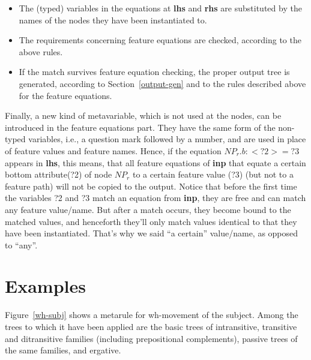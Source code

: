\begin{itemize}
\item   The (typed) variables in the equations at {\bf lhs} and {\bf rhs} are 
        substituted by the names of the nodes they have been instantiated to.

\item   The requirements concerning feature equations are checked, according
        to the above rules.

\item   If the match survives feature equation checking, the proper output tree
        is generated, according to Section~\ref{output-gen} and to the 
        rules described above for the feature equations.
\end{itemize}

Finally, a new kind of metavariable, which is not used at the nodes, can be
introduced in the feature equations part. They have the same form of the
non-typed variables, i.e., a question mark followed by a number, and are used
in place of feature values and feature names. Hence, if the equation
$NP_r.b:<?2> = ?3$ appears in {\bf lhs}, this means, that all feature
equations of {\bf inp} that equate a certain  bottom attribute(?2) of node 
$NP_r$ to a certain feature value (?3) (but not to a feature path) will not 
be copied to the output. Notice that before the first time the variables ?2 
and ?3 match an equation from {\bf inp}, they are free and can match 
any feature
value/name. But after a match occurs, 
they become bound to the matched values, and
henceforth they'll only match values identical to that they have been
instantiated. That's why we said ``a certain'' value/name, as opposed to
``any''.

\setcounter{topnumber}{4}
\setcounter{bottomnumber}{4}
\setcounter{totalnumber}{4}

\section{Examples}
\label{examples}

Figure~\ref{wh-subj} shows a metarule for wh-movement of the subject. Among
the trees to which it have been applied are the basic trees of intransitive, 
transitive and ditransitive families (including prepositional complements),
passive trees of the same families, and ergative.

